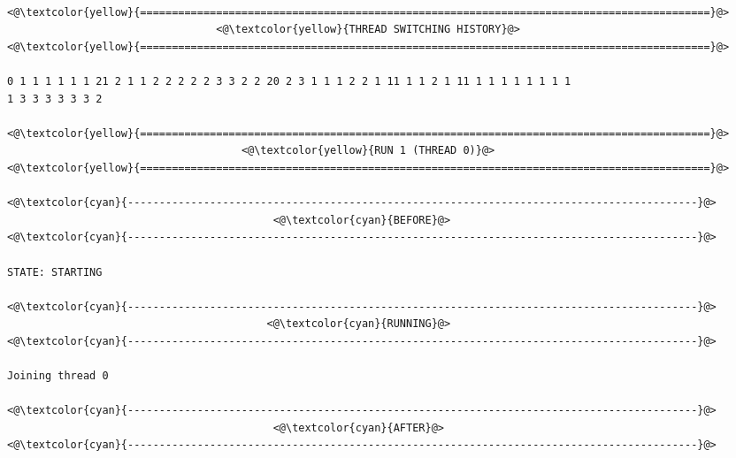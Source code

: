 \begin{adjustwidth}{-3.3cm}{-1cm}



\newenvironment{allintypewriter}{\ttfamily}{\par}

\def\columnseprulecolor{\color{gray}}
\setlength\columnsep{0pt}

\begin{allintypewriter}

\noindent
\obeyspaces
\begin{multicols*}{2}
\noindent	
\obeyspaces
\begin{lstlisting}[numbers=none]

<@\textcolor{yellow}{==========================================================================================}@>
                                 <@\textcolor{yellow}{THREAD SWITCHING HISTORY}@>
<@\textcolor{yellow}{==========================================================================================}@>

0 1 1 1 1 1 1 21 2 1 1 2 2 2 2 2 3 3 2 2 20 2 3 1 1 1 2 2 1 11 1 1 2 1 11 1 1 1 1 1 1 1 1 
1 3 3 3 3 3 3 2 

<@\textcolor{yellow}{==========================================================================================}@>
                                     <@\textcolor{yellow}{RUN 1 (THREAD 0)}@>
<@\textcolor{yellow}{==========================================================================================}@>

<@\textcolor{cyan}{------------------------------------------------------------------------------------------}@>
                                          <@\textcolor{cyan}{BEFORE}@>
<@\textcolor{cyan}{------------------------------------------------------------------------------------------}@>

STATE: STARTING

<@\textcolor{cyan}{------------------------------------------------------------------------------------------}@>
                                         <@\textcolor{cyan}{RUNNING}@>
<@\textcolor{cyan}{------------------------------------------------------------------------------------------}@>

Joining thread 0

<@\textcolor{cyan}{------------------------------------------------------------------------------------------}@>
                                          <@\textcolor{cyan}{AFTER}@>
<@\textcolor{cyan}{------------------------------------------------------------------------------------------}@>


\end{lstlisting}
\end{multicols*}
\end{allintypewriter}
\end{adjustwidth}
